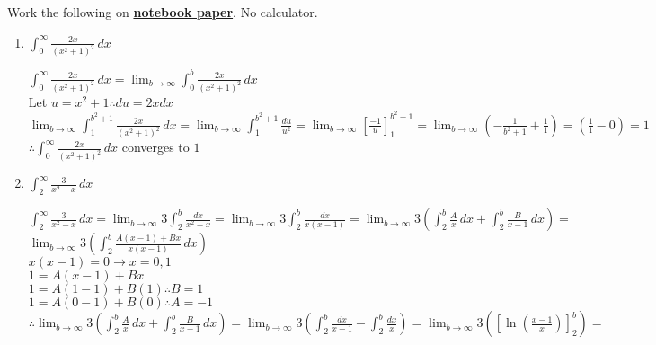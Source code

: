 \documentclass[10pt, letterpaper]{report}
\begin{document}
Work the following on \textbf{\underline{notebook paper}}. No calculator.
\begin{enumerate}
  \item{$\int_{0}^{\infty}{\frac{2x}{\left(x^{2}+1\right)^{2}}}\,dx$ \\}
  
    $\int_{0}^{\infty}{\frac{2x}{\left(x^{2}+1\right)^{2}}}\,dx=
    \lim_{b\to\infty}\int_{0}^{b}{\frac{2x}{\left(x^{2}+1\right)^{2}}}\,dx$ \\
    
    Let $u=x^{2}+1\therefore du=2xdx$ \\
    
    $\lim_{b\to\infty}\int_{1}^{b^{2}+1}{\frac{2x}{\left(x^{2}+1\right)^{2}}}\,dx=
    \lim_{b\to\infty}\int_{1}^{b^{2}+1}{\frac{du}{u^{2}}}=
    \lim_{b\to\infty}[\frac{-1}{u}]_{1}^{b^{2}+1}=
    \lim_{b\to\infty}(-\frac{1}{b^{2}+1}+\frac{1}{1})=
    (\frac{1}{1}-0)=1$ \\
    
    $\therefore \int_{0}^{\infty}{\frac{2x}{\left(x^{2}+1\right)^{2}}}\,dx$ converges to $1$ \\
    
  \item{$\int_{2}^{\infty}{\frac{3}{x^{2}-x}}\,dx$ \\}
    
    $\int_{2}^{\infty}{\frac{3}{x^{2}-x}}\,dx=
    \lim_{b\to\infty}3\int_{2}^{b}{\frac{dx}{x^{2}-x}}=
    \lim_{b\to\infty}3\int_{2}^{b}{\frac{dx}{x(x-1)}}=
    \lim_{b\to\infty}3\left(\int_{2}^{b}{\frac{A}{x}}\,dx+\int_{2}^{b}{\frac{B}{x-1}}\,dx\right)=$ \\
    
    $\lim_{b\to\infty}3\left(\int_{2}^{b}{\frac{A(x-1)+Bx}{x(x-1)}}\,dx\right)$ \\
    
    $x(x-1)=0\rightarrow x=0,1$ \\
    
    $1=A(x-1)+Bx$ \\
    
    $1=A(1-1)+B(1)\therefore B=1$ \\
    
    $1=A(0-1)+B(0)\therefore A=-1$ \\
    
    $\therefore \lim_{b\to\infty}3\left(\int_{2}^{b}{\frac{A}{x}}\,dx+\int_{2}^{b}{\frac{B}{x-1}}\,dx\right)=
    \lim_{b\to\infty}3\left(\int_{2}^{b}{\frac{dx}{x-1}}-\int_{2}^{b}{\frac{dx}{x}}\right)=
    \lim_{b\to\infty}3\left(\left[\ln{\left(\frac{x-1}{x}\right)}\right]_{2}^{b}\right)=$ \\
    

\end{enumerate}
\end{document}
